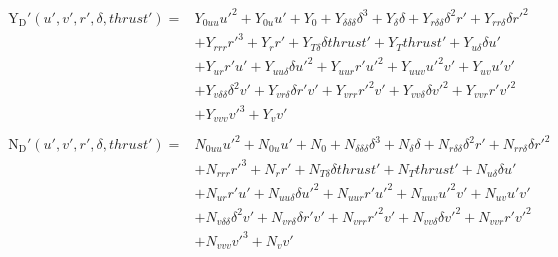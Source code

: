 \begin{equation}\label{equation:02.01_manoeuvring models:eqyabkowitz}
\begin{split}\begin{split}
\operatorname{Y_{D}'}{\left(u',v',r',\delta,thrust' \right)} = & Y_{0uu} u'^{2} + Y_{0u} u' + Y_{0} + Y_{\delta\delta\delta} \delta^{3} + Y_{\delta} \delta + Y_{r\delta\delta} \delta^{2} r' + Y_{rr\delta} \delta r'^{2} \\ & + Y_{rrr} r'^{3} + Y_{r} r' + Y_{T\delta} \delta thrust' + Y_{T} thrust' + Y_{u\delta} \delta u' \\ & + Y_{ur} r' u' + Y_{uu\delta} \delta u'^{2} + Y_{uur} r' u'^{2} + Y_{uuv} u'^{2} v' + Y_{uv} u' v' \\ & + Y_{v\delta\delta} \delta^{2} v' + Y_{vr\delta} \delta r' v' + Y_{vrr} r'^{2} v' + Y_{vv\delta} \delta v'^{2} + Y_{vvr} r' v'^{2} \\ & + Y_{vvv} v'^{3} + Y_{v} v' 
\end{split}\end{split}
\end{equation}\begin{equation}\label{equation:02.01_manoeuvring models:eqnabkowitz}
\begin{split}\begin{split}
\operatorname{N_{D}'}{\left(u',v',r',\delta,thrust' \right)} = & N_{0uu} u'^{2} + N_{0u} u' + N_{0} + N_{\delta\delta\delta} \delta^{3} + N_{\delta} \delta + N_{r\delta\delta} \delta^{2} r' + N_{rr\delta} \delta r'^{2} \\ & + N_{rrr} r'^{3} + N_{r} r' + N_{T\delta} \delta thrust' + N_{T} thrust' + N_{u\delta} \delta u' \\ & + N_{ur} r' u' + N_{uu\delta} \delta u'^{2} + N_{uur} r' u'^{2} + N_{uuv} u'^{2} v' + N_{uv} u' v' \\ & + N_{v\delta\delta} \delta^{2} v' + N_{vr\delta} \delta r' v' + N_{vrr} r'^{2} v' + N_{vv\delta} \delta v'^{2} + N_{vvr} r' v'^{2} \\ & + N_{vvv} v'^{3} + N_{v} v' 
\end{split}\end{split}
\end{equation}


